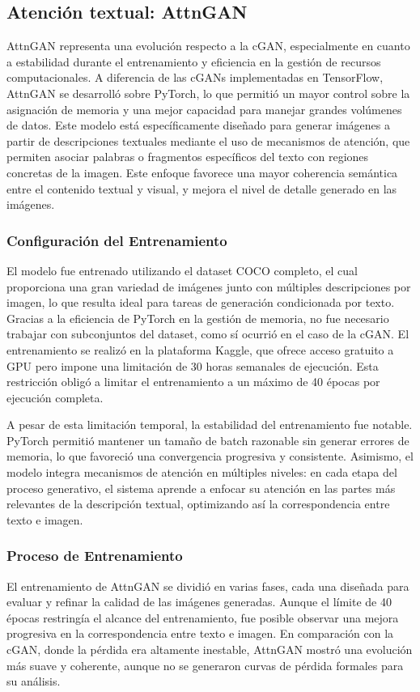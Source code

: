 \subsection{Atención textual: AttnGAN}
AttnGAN representa una evolución respecto a la cGAN, especialmente en cuanto a estabilidad durante el entrenamiento y eficiencia en la gestión de recursos computacionales. A diferencia de las cGANs implementadas en TensorFlow, AttnGAN se desarrolló sobre PyTorch, lo que permitió un mayor control sobre la asignación de memoria y una mejor capacidad para manejar grandes volúmenes de datos. Este modelo está específicamente diseñado para generar imágenes a partir de descripciones textuales mediante el uso de mecanismos de atención, que permiten asociar palabras o fragmentos específicos del texto con regiones concretas de la imagen. Este enfoque favorece una mayor coherencia semántica entre el contenido textual y visual, y mejora el nivel de detalle generado en las imágenes.

\subsubsection{Configuración del Entrenamiento}
El modelo fue entrenado utilizando el dataset COCO completo, el cual proporciona una gran variedad de imágenes junto con múltiples descripciones por imagen, lo que resulta ideal para tareas de generación condicionada por texto. Gracias a la eficiencia de PyTorch en la gestión de memoria, no fue necesario trabajar con subconjuntos del dataset, como sí ocurrió en el caso de la cGAN. El entrenamiento se realizó en la plataforma Kaggle, que ofrece acceso gratuito a GPU pero impone una limitación de 30 horas semanales de ejecución. Esta restricción obligó a limitar el entrenamiento a un máximo de 40 épocas por ejecución completa.

A pesar de esta limitación temporal, la estabilidad del entrenamiento fue notable. PyTorch permitió mantener un tamaño de batch razonable sin generar errores de memoria, lo que favoreció una convergencia progresiva y consistente. Asimismo, el modelo integra mecanismos de atención en múltiples niveles: en cada etapa del proceso generativo, el sistema aprende a enfocar su atención en las partes más relevantes de la descripción textual, optimizando así la correspondencia entre texto e imagen.

\subsubsection{Proceso de Entrenamiento}
El entrenamiento de AttnGAN se dividió en varias fases, cada una diseñada para evaluar y refinar la calidad de las imágenes generadas. Aunque el límite de 40 épocas restringía el alcance del entrenamiento, fue posible observar una mejora progresiva en la correspondencia entre texto e imagen. En comparación con la cGAN, donde la pérdida era altamente inestable, AttnGAN mostró una evolución más suave y coherente, aunque no se generaron curvas de pérdida formales para su análisis.


